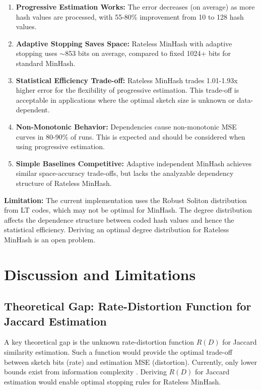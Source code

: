 \documentclass[11pt,letterpaper]{article}
\begin{document}
\begin{enumerate}
    \item \textbf{Progressive Estimation Works:} The error decreases (on average) as more hash values are processed, with 55-80\% improvement from 10 to 128 hash values.
    
    \item \textbf{Adaptive Stopping Saves Space:} Rateless MinHash with adaptive stopping uses $\sim$853 bits on average, compared to fixed 1024+ bits for standard MinHash.
    
    \item \textbf{Statistical Efficiency Trade-off:} Rateless MinHash trades 1.01-1.93x higher error for the flexibility of progressive estimation. This trade-off is acceptable in applications where the optimal sketch size is unknown or data-dependent.
    
    \item \textbf{Non-Monotonic Behavior:} Dependencies cause non-monotonic MSE curves in 80-90\% of runs. This is expected and should be considered when using progressive estimation.
    
    \item \textbf{Simple Baselines Competitive:} Adaptive independent MinHash achieves similar space-accuracy trade-offs, but lacks the analyzable dependency structure of Rateless MinHash.
\end{enumerate}

\textbf{Limitation:} The current implementation uses the Robust Soliton distribution from LT codes, which may not be optimal for MinHash. The degree distribution affects the dependence structure between coded hash values and hence the statistical efficiency. Deriving an optimal degree distribution for Rateless MinHash is an open problem.

\section{Discussion and Limitations}

\subsection{Theoretical Gap: Rate-Distortion Function for Jaccard Estimation}

A key theoretical gap is the unknown rate-distortion function $R(D)$ for Jaccard similarity estimation. Such a function would provide the optimal trade-off between sketch bits (rate) and estimation MSE (distortion). Currently, only lower bounds exist from information complexity \cite{Pagh2014}. Deriving $R(D)$ for Jaccard estimation would enable optimal stopping rules for Rateless MinHash.
\end{document}

